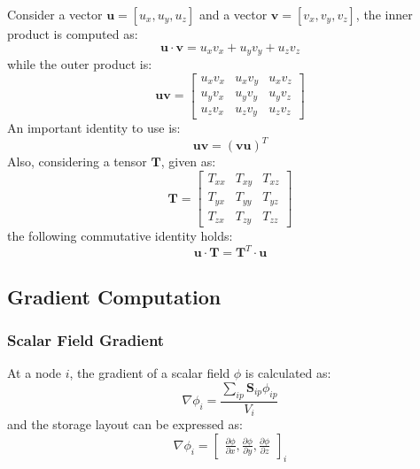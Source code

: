 \documentclass[12pt]{extarticle}
\newcommand{\<}{\langle}
\renewcommand{\>}{\rangle}
\theoremstyle{definition}
\begin{document}
Consider a vector $\textbf{u}=[u_x,u_y,u_z]$ and a vector $\textbf{v}=[v_x,v_y,v_z]$, the inner product is computed as:
\begin{equation}
    \textbf{u} \cdot \textbf{v} = u_x v_x + u_y v_y + u_z v_z
\end{equation}
while the outer product is:
\begin{equation}
    \textbf{u} \textbf{v} = 
    \begin{bmatrix}
        u_xv_x & u_xv_y & u_xv_z \\[0.5em]
        u_yv_x & u_yv_y & u_yv_z \\[0.5em]
        u_zv_x & u_zv_y & u_zv_z
    \end{bmatrix}
\end{equation}
An important identity to use is:
\begin{equation}
    \textbf{u}\textbf{v} = \left(\textbf{v}\textbf{u}\right)^T    
\end{equation}
Also, considering a tensor $\textbf{T}$, given as:
\begin{equation}
    \textbf{T} = 
    \begin{bmatrix}
        T_{xx} & T_{xy} & T_{xz} \\[0.5em]
        T_{yx} & T_{yy} & T_{yz} \\[0.5em]
        T_{zx} & T_{zy} & T_{zz}
    \end{bmatrix}
\end{equation}
the following commutative identity holds:
\begin{equation}
    \textbf{u} \cdot \textbf{T} = \textbf{T}^T \cdot \textbf{u}
\end{equation}

\subsection{Gradient Computation}

\subsubsection{Scalar Field Gradient}
At a node $i$, the gradient of a scalar field $\phi$ is calculated as:
\begin{equation}
    \nabla \phi_i = \frac{\sum\limits_{ip} \textbf{S}_{ip} \phi_{ip}}{V_i}
\end{equation}
and the storage layout can be expressed as:
\begin{equation}
    \nabla \phi_i = 
    \begin{bmatrix}
        \frac{\partial \phi}{\partial x},
        \frac{\partial \phi}{\partial y},
        \frac{\partial \phi}{\partial z}
    \end{bmatrix}_i
\end{equation}
\end{document}
